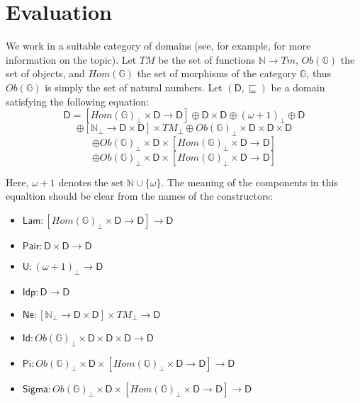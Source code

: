 \documentclass{amsart}
\theoremstyle{definition}
\theoremstyle{remark}
\newcommand{\D}{\mathsf{D}}
\newcommand{\bbG}{\mathbb{G}}
\newcommand{\nats}{\mathbb{N}}
\numberwithin{table}{section}
\begin{document}
\section{Evaluation}
\label{sec:eval}

We work in a suitable category of domains (see, for example, \cite{domains} for more information on the topic).
Let $TM$ be the set of functions $\nats \to Tm$, $Ob(\bbG)$ the set of objects,
and $Hom(\bbG)$ the set of morphisms of the category $\bbG$, thus $Ob(\bbG)$ is simply the set of natural numbers.
Let $(\D,\sqsubseteq)$ be a domain satisfying the following equation:
\[ \D = [Hom(\bbG)_\bot \times \D \to \D] \oplus \D \times \D \oplus (\omega + 1)_\bot \oplus \D \]
\[ \oplus [\nats_\bot \to \D \times \D] \times TM_\bot \oplus Ob(\bbG)_\bot \times \D \times \D \times \D \]
\[ \oplus Ob(\bbG)_\bot \times \D \times [Hom(\bbG)_\bot \times \D \to \D] \]
\[ \oplus Ob(\bbG)_\bot \times \D \times [Hom(\bbG)_\bot \times \D \to \D] \]

Here, $\omega + 1$ denotes the set $\nats \cup \{ \omega \}$.
The meaning of the components in this equaltion should be clear from the names of the constructors:
\begin{itemize}
\item[] $\mathsf{Lam} : [Hom(\bbG)_\bot \times \D \to \D] \to \D$
\item[] $\mathsf{Pair} : \D \times \D \to \D$
\item[] $\mathsf{U} : (\omega + 1)_\bot \to \D$
\item[] $\mathsf{Idp} : \D \to \D$
\item[] $\mathsf{Ne} : [\nats_\bot \to \D \times \D] \times TM_\bot \to \D$
\item[] $\mathsf{Id} : Ob(\bbG)_\bot \times \D \times \D \times \D \to \D$
\item[] $\mathsf{Pi} : Ob(\bbG)_\bot \times \D \times [Hom(\bbG)_\bot \times \D \to \D] \to \D$
\item[] $\mathsf{Sigma} : Ob(\bbG)_\bot \times \D \times [Hom(\bbG)_\bot \times \D \to \D] \to \D$
\end{itemize}
\end{document}
